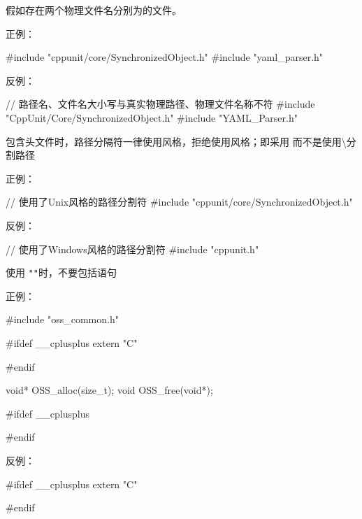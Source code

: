 \begin{content}
假如存在两个物理文件名分别为的文件。

正例：
\begin{leftbar}
\begin{c++}
#include "cppunit/core/SynchronizedObject.h"
#include "yaml_parser.h"
\end{c++}
\end{leftbar}

反例：
\begin{leftbar}
\begin{c++}
// 路径名、文件名大小写与真实物理路径、物理文件名称不符
#include "CppUnit/Core/SynchronizedObject.h"
#include "YAML_Parser.h"
\end{c++}
\end{leftbar}

\begin{regulation}
包含头文件时，路径分隔符一律使用风格，拒绝使用风格；即采用\code{/}
而不是使用\textbackslash{}分割路径
\end{regulation}

正例：
\begin{leftbar}
\begin{c++}
// 使用了Unix风格的路径分割符
#include "cppunit/core/SynchronizedObject.h"
\end{c++}
\end{leftbar}

反例：
\begin{leftbar}
\begin{c++}
// 使用了Windows风格的路径分割符
#include "cppunit\core\SynchronizedObject.h"
\end{c++}
\end{leftbar}

\begin{regulation}
使用 \texttt{"}\texttt{"}时，不要包括语句
\end{regulation}

正例：
\begin{leftbar}
\begin{c++}
#include "oss_common.h"

#ifdef  __cplusplus
extern "C" {
#endif

void* OSS_alloc(size_t);
void  OSS_free(void*);

#ifdef  __cplusplus
}
#endif
\end{c++}
\end{leftbar}

反例：
\begin{leftbar}
\begin{c++}
#ifdef  __cplusplus
extern "C" {
#endif

}
\end{c++}
\end{leftbar}
\end{content}
